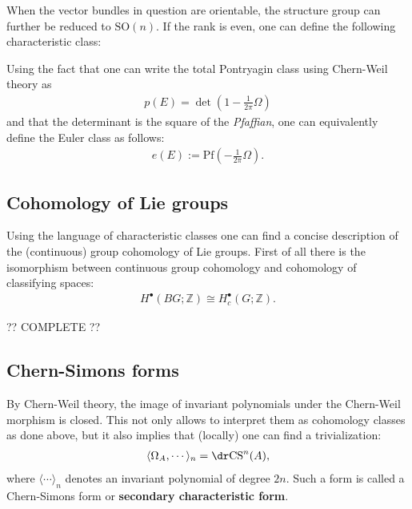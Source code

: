     When the vector bundles in question are orientable, the structure group can further be reduced to $\mathrm{SO}(n)$. If the rank is even, one can define the following characteristic class:
    \begin{property}
        Using the fact that one can write the total Pontryagin class using Chern-Weil theory as
        \begin{gather}
            p(E) = \det\left(1-\frac{1}{2\pi}\Omega\right)
        \end{gather}
        and that the determinant is the square of the \textit{Pfaffian}, one can equivalently define the Euler class as follows:
        \begin{gather}
            e(E) := \mathrm{Pf}\left(-\frac{1}{2\pi}\Omega\right).
        \end{gather}
    \end{property}

\subsection{Cohomology of Lie groups}

    Using the language of characteristic classes one can find a concise description of the (continuous) group cohomology of Lie groups. First of all there is the isomorphism between continuous group cohomology and cohomology of classifying spaces:
    \begin{gather}
        H^\bullet(BG;\mathbb{Z})\cong H^\bullet_c(G;\mathbb{Z}).
    \end{gather}

    ?? COMPLETE ??

\subsection{Chern-Simons forms}\label{section:chern_simons}

    By Chern-Weil theory, the image of invariant polynomials under the Chern-Weil morphism is closed. This not only allows to interpret them as cohomology classes as done above, but it also implies that (locally) one can find a trivialization:
    \begin{gather}
        \langle\Omega_A,\cdots\rangle_n = \dr\mathrm{CS}^n(A),
    \end{gather}
    where $\langle\cdots\rangle_n$ denotes an invariant polynomial of degree $2n$. Such a form is called a Chern-Simons form or \textbf{secondary characteristic form}.

